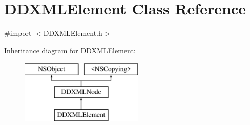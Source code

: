 \hypertarget{interface_d_d_x_m_l_element}{}\section{D\+D\+X\+M\+L\+Element Class Reference}
\label{interface_d_d_x_m_l_element}


{\ttfamily \#import $<$D\+D\+X\+M\+L\+Element.\+h$>$}

Inheritance diagram for D\+D\+X\+M\+L\+Element\+:\begin{figure}[H]
\begin{center}
\leavevmode
\includegraphics[height=3.000000cm]{interface_d_d_x_m_l_element}
\end{center}
\end{figure}
